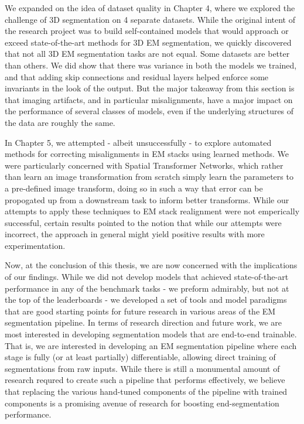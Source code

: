 We expanded on the idea of dataset quality in Chapter 4, where we explored the challenge of 3D segmentation on 4 separate datasets. While the original intent of the research project was to build self-contained models that would approach or exceed state-of-the-art methods for 3D EM segmentation, we quickly discovered that not all 3D EM segmentation tasks are not equal. Some datasets are better than others. We did show that there was variance in both the models we trained, and that adding skip connections and residual layers helped enforce some invariants in the look of the output. But the major takeaway from this section is that imaging artifacts, and in particular misalignments, have a major impact on the performance of several classes of models, even if the underlying structures of the data are roughly the same.

In Chapter 5, we attempted - albeit unsuccessfully - to explore automated methods for correcting misalignments in EM stacks using learned methods. We were particularly concerned with Spatial Transformer Networks, which rather than learn an image transformation from scratch simply learn the parameters to a pre-defined image transform, doing so in such a way that error can be propogated up from a downstream task to inform better transforms. While our attempts to apply these techniques to EM stack realignment were not emperically successful, certain results pointed to the notion that while our attempts were incorrect, the approach in general might yield positive results with more experimentation. 

Now, at the conclusion of this thesis, we are now concerned with the implications of our findings. While we did not develop models that achieved state-of-the-art performance in any of the benchmark tasks - we preform admirably, but not at the top of the leaderboards - we developed a set of tools and model paradigms that are good starting points for future research in various areas of the EM segmentation pipeline. In terms of research direction and future work, we are most interested in developing segmentation models that are end-to-end trainable. That is, we are interested in developing an EM segmentation pipeline where each stage is fully (or at least partially) differentiable, allowing direct training of segmentations from raw inputs. While there is still a monumental amount of research requred to create such a pipeline that performs effectively, we believe that replacing the various hand-tuned components of the pipeline with trained components is a promising avenue of research for boosting end-segmentation performance. 
